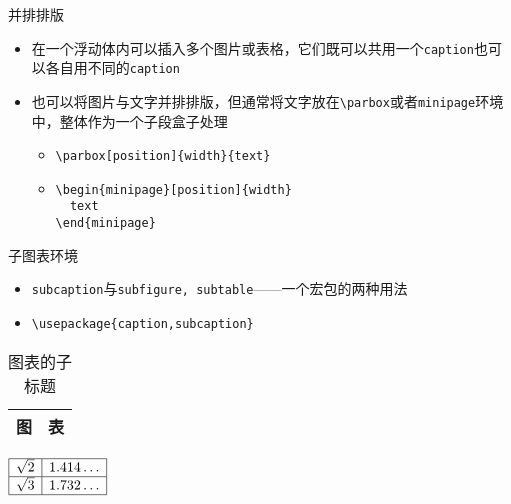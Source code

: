 \begin{frame}[fragile]{并排排版}
	\begin{itemize}
		\item 在一个浮动体内可以插入多个图片或表格，它们既可以共用一个\texttt{caption}也可以各自用不同的\texttt{caption}
		\item 也可以将图片与文字并排排版，但通常将文字放在\verb|\parbox|或者\texttt{minipage}环境中，整体作为一个子段盒子处理
		\begin{itemize}
			\item \verb|\parbox[position]{width}{text}|
			\item \verb|\begin{minipage}[position]{width}| \\
				  \verb|  text|\\
				  \verb|\end{minipage}|
		\end{itemize}
	\end{itemize}
\end{frame}
\begin{frame}[fragile]{子图表环境}
	\begin{itemize}
		\item \texttt{subcaption}与\texttt{subfigure, subtable}——一个宏包的两种用法
		\item \verb|\usepackage{caption,subcaption}|
	\end{itemize}
	\begin{table}
		\caption{图表的子标题}
		\begin{minipage}[b]{.49\textwidth}
			\centering
			\begin{tabular}{|c|c|}
				\hline 图 & 表 \\ \hline
			\end{tabular}
		\end{minipage}
		\begin{minipage}[b]{.49\textwidth}
			\centering
			$\begin{array}{|c|c|}	
				\hline \sqrt{2} & 1.414\dots \\ \hline
				\sqrt{3} & 1.732\dots \\ \hline
			\end{array}$
		\end{minipage}
	\end{table}
\end{frame}
